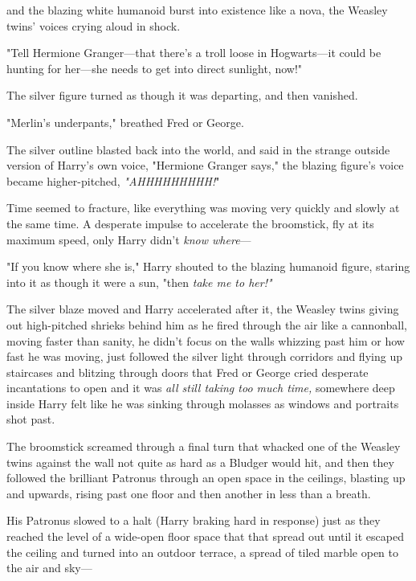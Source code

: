 and the blazing white humanoid burst into existence like a nova, the Weasley 
twins' voices crying aloud in shock.

"Tell Hermione Granger---that there's a troll loose in Hogwarts---it could be 
hunting for her---she needs to get into direct sunlight, now!"

The silver figure turned as though it was departing, and then vanished.

"Merlin's underpants," breathed Fred or George.

The silver outline blasted back into the world, and said in the strange outside 
version of Harry's own voice, "Hermione Granger says," the blazing figure's 
voice became higher-pitched, \emph{"AHHHHHHHHH!}"

Time seemed to fracture, like everything was moving very quickly and slowly at 
the same time. A desperate impulse to accelerate the broomstick, fly at its 
maximum speed, only Harry didn't \emph{know where}---

"If you know where she is," Harry shouted to the blazing humanoid figure, 
staring into it as though it were a sun, "then \emph{take me to her!"}

The silver blaze moved and Harry accelerated after it, the Weasley twins giving 
out high-pitched shrieks behind him as he fired through the air like a 
cannonball, moving faster than sanity, he didn't focus on the walls whizzing 
past him or how fast he was moving, just followed the silver light through 
corridors and flying up staircases and blitzing through doors that Fred or 
George cried desperate incantations to open and it was \emph{all still taking 
too much time,} somewhere deep inside Harry felt like he was sinking through 
molasses as windows and portraits shot past.

The broomstick screamed through a final turn that whacked one of the Weasley 
twins against the wall not quite as hard as a Bludger would hit, and then they 
followed the brilliant Patronus through an open space in the ceilings, blasting 
up and upwards, rising past one floor and then another in less than a breath.

His Patronus slowed to a halt (Harry braking hard in response) just as they 
reached the level of a wide-open floor space that that spread out until it 
escaped the ceiling and turned into an outdoor terrace, a spread of tiled 
marble open to the air and sky---